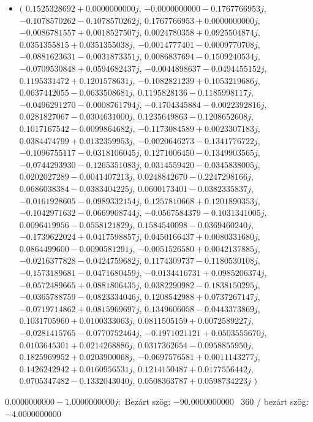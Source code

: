 \documentclass[14pt,a4paper]{article}
\begin{document}
\begin{itemize}
\item
$\big($
$0.1525328692+0.0000000000j$, $-0.0000000000-0.1767766953j$, $-0.1078570262-0.1078570262j$, $0.1767766953+0.0000000000j$, $-0.0086781557+0.0018527507j$, $0.0024780358+0.0925504874j$, $0.0351355815+0.0351355038j$, $-0.0014777401-0.0009770708j$, $-0.0881623631-0.0031873351j$, $0.0086837694-0.1509240534j$, $-0.0709530848+0.0594682437j$, $-0.0044898637-0.0494455152j$, $0.1195331472+0.1201578631j$, $-0.1082821239+0.1053219686j$, $0.0637442055-0.0633508681j$, $0.1195828136-0.1185998117j$, $-0.0496291270-0.0008761794j$, $-0.1704345884-0.0022392816j$, $0.0281827067-0.0304631000j$, $0.1235649863-0.1208652608j$, $0.1017167542-0.0099864682j$, $-0.1173084589+0.0023307183j$, $0.0384474799+0.0132359953j$, $-0.0020646273-0.1341776722j$, $-0.1096755117-0.0318106045j$, $0.1271006450-0.1349903565j$, $-0.0744293930-0.1265351083j$, $0.0314559420-0.0345838005j$, $0.0202027289-0.0041407213j$, $0.0248842670-0.2247298166j$, $0.0686038384-0.0383404225j$, $0.0600173401-0.0382335837j$, $-0.0161928605-0.0989332154j$, $0.1257810668+0.1201890353j$, $-0.1042971632-0.0669908744j$, $-0.0567584379-0.1031341005j$, $0.0096419956-0.0558121829j$, $0.1584540098-0.0369460240j$, $-0.1739622024+0.0417598857j$, $0.0450166437+0.0080331680j$, $0.0864499600-0.0090581291j$, $-0.0051526580+0.0042137885j$, $-0.0216377828-0.0424759682j$, $0.1174309737-0.1180530108j$, $-0.1573189681-0.0471680459j$, $-0.0134416731+0.0985206374j$, $-0.0572489665+0.0881806435j$, $0.0382290982-0.1838150295j$, $-0.0365788759-0.0823334046j$, $0.1208542988+0.0737267147j$, $-0.0719714862+0.0815969697j$, $0.1349606058-0.0443373869j$, $0.1031705960+0.0100333063j$, $0.0811505159+0.0072589227j$, $-0.0281415765-0.0770752464j$, $-0.1971021121+0.0503555670j$, $0.0103645301+0.0214268886j$, $0.0317362654-0.0958855950j$, $0.1825969952+0.0203900068j$, $-0.0697576581+0.0011143277j$, $0.1426242942+0.0160956531j$, $0.1214150487+0.0177556442j$, $0.0705347482-0.1332043040j$, $0.0508363787+0.0598734223j$
$\big)$
\end{itemize}
$0.0000000000-1.0000000000j$:\
Bezárt szög: $-90.0000000000$ \
360 / bezárt szög: $-4.0000000000$\
\end{document}

